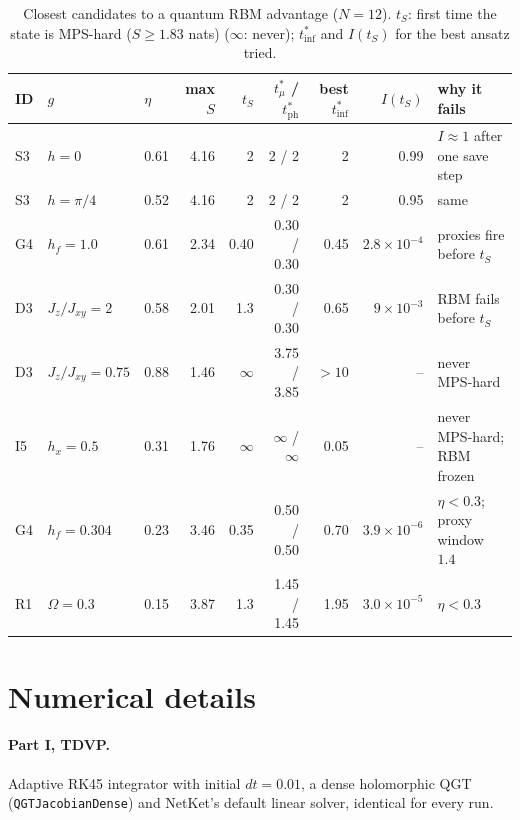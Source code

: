 \documentclass[11pt,a4paper]{article}
\newcommand{\inff}{I}
\newcommand{\tmu}{t^*_\mu}
\newcommand{\tinf}{t^*_{\mathrm{inf}}}
\newcommand{\tph}{t^*_{\mathrm{ph}}}
\begin{document}
\begin{table}[h]
  \centering
  \caption{Closest candidates to a quantum RBM advantage ($N=12$). $t_S$: first time the state is MPS-hard ($S\ge1.83$ nats)
    ($\infty$: never); $\tinf$ and $\inff(t_S)$ for the best ansatz tried.}
  \label{tab:gold}
  \scriptsize
  \setlength{\tabcolsep}{3pt}
  \begin{tabular}{lllrrrrrl}
    \toprule
    ID & $g$ & $\eta$ & max $S$ & $t_S$ & $\tmu$ / $\tph$ & best $\tinf$ & $\inff(t_S)$ & why it fails\\
    \midrule
    S3 & $h=0$ & 0.61 & 4.16 & 2 & 2 / 2 & 2 & 0.99 & $\inff\approx1$ after one save step\\
    S3 & $h=\pi/4$ & 0.52 & 4.16 & 2 & 2 / 2 & 2 & 0.95 & same\\
    G4 & $h_f=1.0$ & 0.61 & 2.34 & 0.40 & 0.30 / 0.30 & 0.45 & $2.8\times10^{-4}$ & proxies fire before $t_S$\\
    D3 & $J_z/J_{xy}=2$ & 0.58 & 2.01 & 1.3 & 0.30 / 0.30 & 0.65 & $9\times10^{-3}$ & RBM fails before $t_S$\\
    D3 & $J_z/J_{xy}=0.75$ & 0.88 & 1.46 & $\infty$ & 3.75 / 3.85 & $>10$ & -- & never MPS-hard\\
    I5 & $h_x=0.5$ & 0.31 & 1.76 & $\infty$ & $\infty$ / $\infty$ & 0.05 & -- & never MPS-hard; RBM frozen\\
    G4 & $h_f=0.304$ & 0.23 & 3.46 & 0.35 & 0.50 / 0.50 & 0.70 & $3.9\times10^{-6}$ & $\eta<0.3$; proxy window $1.4$\\
    R1 & $\Omega=0.3$ & 0.15 & 3.87 & 1.3 & 1.45 / 1.45 & 1.95 & $3.0\times10^{-5}$ & $\eta<0.3$\\
    \bottomrule
  \end{tabular}
\end{table}

\FloatBarrier
\section{Numerical details}
\label{app:num}

\paragraph{Part I, TDVP.} Adaptive RK45 integrator with initial $dt=0.01$, a dense holomorphic QGT
(\texttt{QGTJacobianDense}) and NetKet's default linear solver, identical for every run.
\end{document}
